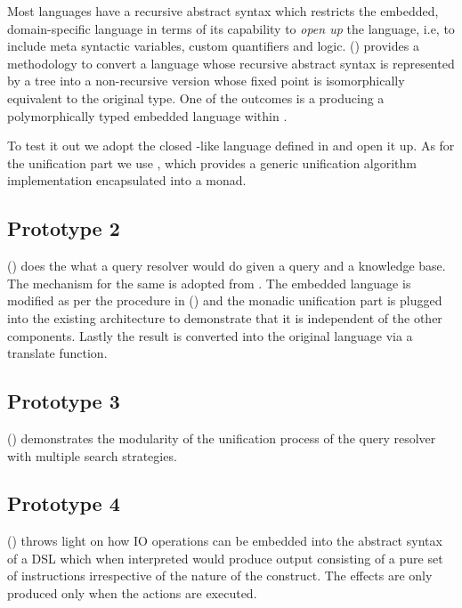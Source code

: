 \documentclass[thesis-solanki.tex]{subfiles}
\begin{document}
Most languages have a recursive abstract syntax which restricts the embedded, domain-specific language
  in terms of its capability to \textit{open up} the language, i.e, to include meta syntactic
  variables, custom quantifiers and logic.
  () provides a methodology to convert a language whose recursive abstract
  syntax is represented by a tree into a non-recursive version whose fixed point is isomorphically equivalent to
  the original type.
  One of the outcomes is a producing a polymorphically typed embedded language within .

  To test it out we adopt the closed -like language defined in \cite{prolog-lib} and open it up.
  As for the unification part we use \cite{unification-fd-lib}, which provides a generic unification algorithm
  implementation encapsulated into a monad.


\subsection{Prototype 2}

  () does the what a  query resolver would do given a
  query and a knowledge base.
  The mechanism for the same is adopted from \cite{prolog-lib}.
  The embedded language is modified as per the procedure in () and the
  monadic unification part is plugged into the existing architecture to demonstrate that it is independent of the
  other components.
  Lastly the result is converted into the original language via a translate function.

\subsection{Prototype 3}

  () demonstrates the modularity of the unification process of the query
  resolver with multiple search strategies.

\subsection{Prototype 4}

  () throws light on how IO operations can be embedded into the abstract
  syntax of a DSL which when interpreted would produce output consisting of a pure set of instructions irrespective
  of the nature of the construct.
  The effects are only produced only when the actions are executed.
\end{document}

